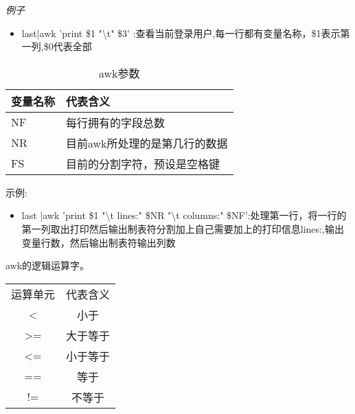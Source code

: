 \documentclass{book}
\begin{document}
\textit{例子}
\begin{itemize}
	\item  last|awk '{print \$1 "\textbackslash t" \$3}' :查看当前登录用户,每一行都有变量名称，\$1表示第一列,\$0代表全部
	
\end{itemize}
\begin{table}[h!]
\centering
{
\begin{tabular}{ |p{3cm}|p{3cm}|  }
	\hline 
	变量名称 & 代表含义 \\
	\hline
	NF & 每行拥有的字段总数 \\
	NR    &目前awk所处理的是第几行的数据\\
	FS & 目前的分割字符，预设是空格键 \\
	\hline
\end{tabular}}
	\caption{awk参数}
\end{table}
示例:
\begin{itemize}
		\item last |awk '{print \$1 "\textbackslash t lines:" \$NR "\textbackslash t columns:" \$NF}':处理第一行，将一行的第一列取出打印然后输出制表符分割加上自己需要加上的打印信息lines:,输出变量行数，然后输出制表符输出列数
\end{itemize}
awk的逻辑运算字。
\begin{table}[h]
\centering
{
	\begin{tabular}{|c|c|}
		\hline
		运算单元&代表含义\\
		<&小于\\
		>=&大于等于\\
		<=&小于等于\\
		==&等于\\
		!=&不等于\\
		\hline
	\end{tabular}}
\end{table}
\end{document}
